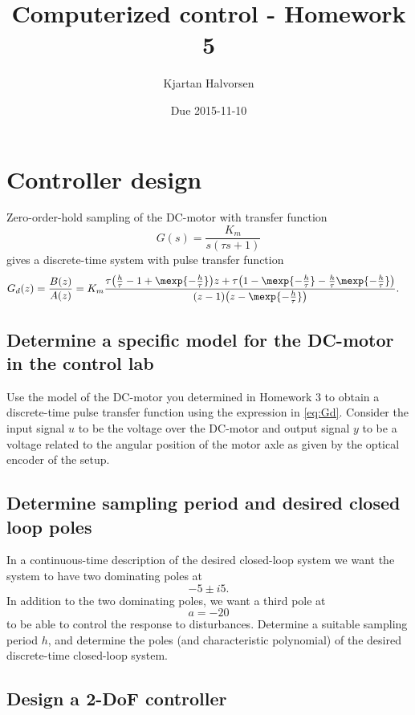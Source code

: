 \documentclass{scrartcl}
\title{Computerized control - Homework 5}
\author{Kjartan Halvorsen}
\date{Due 2015-11-10}
\begin{document}
\maketitle



\section{Controller design}
\label{sec-1}

  Zero-order-hold sampling of the DC-motor with transfer function
  \[ G(s) = \frac{K_m}{s(\tau{}s+1)} \]
  gives a discrete-time system with pulse transfer function
  \begin{equation}
  \begin{split}
  G_d(z) &= \frac{B(z)}{A(z)}= K_m \frac{\tau\big(\frac{h}{\tau}-1+\mexp{-\frac{h}{\tau}}\big)z + \tau\big(1-\mexp{-\frac{h}{\tau}}-\frac{h}{\tau}\mexp{-\frac{h}{\tau}}\big)}{(z-1)\big(z-\mexp{-\frac{h}{\tau}}\big)}.
  \end{split}
  \label{eq:Gd}
  \end{equation}
\subsection{Determine a specific model for the DC-motor in the control lab}
\label{sec-1-1}

   Use the model of the DC-motor you determined in Homework 3 to obtain a discrete-time  pulse transfer function using the expression in \eqref{eq:Gd}. Consider the input signal $u$ to be the voltage over the DC-motor and output signal $y$ to be a voltage related to the angular position of the motor axle as given by the optical encoder of the setup. 
\subsection{Determine sampling period and desired closed loop poles}
\label{sec-1-2}

   In a continuous-time description of the desired closed-loop system we want the system to have two dominating poles at
   \[ -5 \pm i5. \]
   In addition to the two dominating poles, we want a third pole at
   \[ a=-20 \]
   to be able to control the response to disturbances. Determine a suitable sampling period $h$, and determine the poles (and characteristic polynomial) of the desired discrete-time closed-loop system.
\subsection{Design a 2-DoF controller}
\label{sec-1-3}
\end{document}
